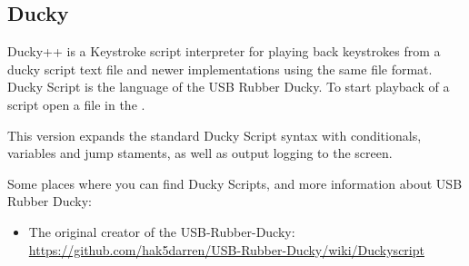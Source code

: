 \subsection{Ducky}
Ducky++ is a Keystroke script interpreter for playing back keystrokes from a
ducky script text file and newer implementations using the same file format.
Ducky Script is the language of the USB Rubber Ducky.  To start playback of 
a script open a  file in the .

This version expands the standard Ducky Script syntax with conditionals,
 variables and jump staments, as well as output logging to the screen.

Some places where you can find Ducky Scripts, and more information about
USB Rubber Ducky:
\begin{itemize}
\item The original creator of the USB-Rubber-Ducky:
\url{https://github.com/hak5darren/USB-Rubber-Ducky/wiki/Duckyscript}
\end{itemize}

